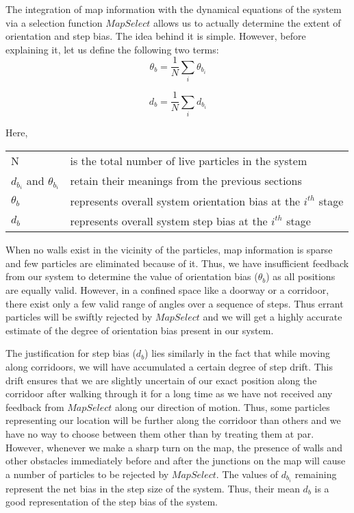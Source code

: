 The integration of map information with the dynamical equations of the system 
via a selection function $MapSelect$ allows us to actually determine 
the extent of orientation and step bias. The idea behind it is simple. 
However, before explaining it, let us define the following two terms:
\begin{equation}
\displaystyle
\theta_b = \frac{1}{N}\sum\limits_{i} \theta_{b_i}
\end{equation}

\begin{equation}
\displaystyle
d_b = \frac{1}{N}\sum\limits_{i} d_{b_i}
\end{equation}

Here,\\
\begin{tabular}{p{1.5in} p{3.5in}}
N & is the total number of live particles in the system \\
$d_{b_i}$ and $\theta_{b_i}$ & retain their meanings from the previous sections \\
$\theta_b$ & represents overall system orientation bias at the $i^{th}$ stage \\
$d_b$ & represents overall system step bias at the $i^{th}$ stage \\
\end{tabular}

When no walls exist in the vicinity of the particles, map information is sparse
and few particles are eliminated because of it. Thus, we have insufficient 
feedback from our system to determine the value of orientation bias ($\theta_b$)
as all positions are equally valid. However, in a confined space like a 
doorway or a corridoor, there exist only a few valid range of angles over 
a sequence of steps. Thus
errant particles will be swiftly rejected by $MapSelect$ and we will 
get a highly accurate estimate of the degree of orientation bias present 
in our system.

The justification for step bias ($d_b$) lies similarly in the fact that while
moving along corridoors, we will have accumulated
a certain degree of step drift. This drift ensures that we are slightly 
uncertain of our exact position along the corridoor after walking through it for a long time
as we have not received any feedback from $MapSelect$ along our direction of motion. 
Thus,
some particles representing our location will be further along the corridoor than others and we have no way 
to choose between them other than by treating them at par. However, 
whenever we make a sharp turn on the map, the presence of walls and other 
obstacles immediately before and after the junctions on the map will cause 
a number of particles to be rejected by $MapSelect$. The values of $d_{b_i}$
remaining represent the net bias in the step size of the system. Thus,
their mean $d_b$ is a good representation of the step bias of the system.

